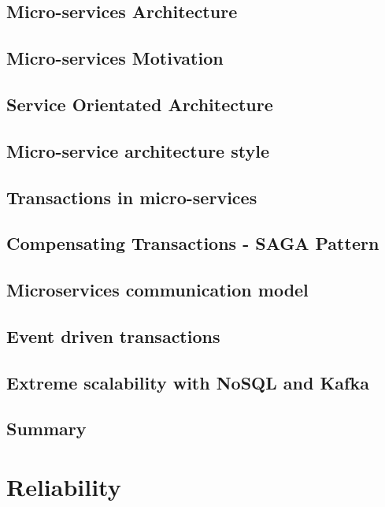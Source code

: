 \documentclass[11pt]{article}
\begin{document}
\section{Micro-services Architecture}

\section{Micro-services Motivation}

\section{Service Orientated Architecture}

\section{Micro-service architecture style}

\section{Transactions in micro-services}

\section{Compensating Transactions - SAGA Pattern}

\section{Microservices communication model}

\section{Event driven transactions}

\section{Extreme scalability with NoSQL and Kafka}

\section{Summary}

\chapter{Reliability}
\end{document}
